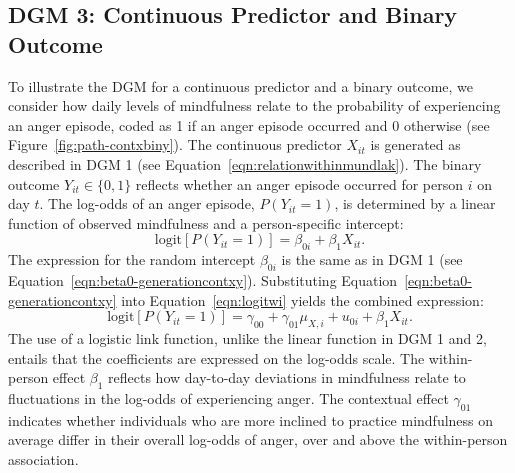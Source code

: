 \documentclass[stu]{apa7}
\begin{document}
\subsection{DGM 3: Continuous Predictor and Binary Outcome}

To illustrate the DGM for a continuous predictor and a binary outcome, we consider how daily levels of mindfulness relate to the probability of experiencing an anger episode, coded as 1 if an anger episode occurred and 0 otherwise (see Figure~\ref{fig:path-contxbiny}). The continuous predictor \( X_{it} \) is generated as described in DGM 1 (see Equation~\ref{eqn:relationwithinmundlak}). The binary outcome \( Y_{it} \in \{0, 1\} \) reflects whether an anger episode occurred for person \( i \) on day \( t \). The log-odds of an anger episode, \( P(Y_{it} = 1) \), is determined by a linear function of observed mindfulness and a person-specific intercept:
\begin{equation}
    \label{eqn:logitwi}
    \text{logit} \left[ P(Y_{it} = 1) \right] = \beta_{0i} + \beta_1 X_{it}.
\end{equation}
The expression for the random intercept \( \beta_{0i} \) is the same as in DGM 1 (see Equation~\ref{eqn:beta0-generationcontxy}). Substituting Equation~\ref{eqn:beta0-generationcontxy} into Equation~\ref{eqn:logitwi} yields the combined expression:
\begin{equation}
    \label{eqn:dgm3-fullequation}
    \text{logit} \left[ P(Y_{it} = 1) \right] = \gamma_{00} + \gamma_{01} \mu_{X,i} + u_{0i} + \beta_1 X_{it}.
\end{equation}
The use of a logistic link function, unlike the linear function in DGM 1 and 2, entails that the coefficients are expressed on the log-odds scale. The within-person effect $\beta_1$ reflects how day-to-day deviations in mindfulness relate to fluctuations in the log-odds of experiencing anger. The contextual effect $\gamma_{01}$ indicates whether individuals who are more inclined to practice mindfulness on average differ in their overall log-odds of anger, over and above the within-person association.

\end{document}
